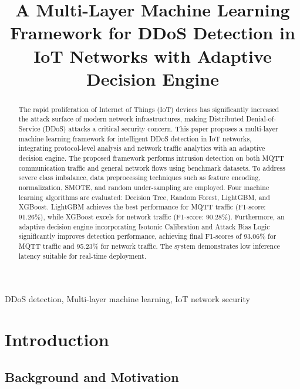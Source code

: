 \documentclass[conference]{IEEEtran}
\begin{document}
\title{A Multi-Layer Machine Learning Framework for DDoS Detection in IoT Networks with Adaptive Decision Engine}

\author{
}

\maketitle

\begin{abstract}
The rapid proliferation of Internet of Things (IoT) devices has significantly increased the attack surface of modern network infrastructures, making Distributed Denial-of-Service (DDoS) attacks a critical security concern. This paper proposes a multi-layer machine learning framework for intelligent DDoS detection in IoT networks, integrating protocol-level analysis and network traffic analytics with an adaptive decision engine. The proposed framework performs intrusion detection on both MQTT communication traffic and general network flows using benchmark datasets. To address severe class imbalance, data preprocessing techniques such as feature encoding, normalization, SMOTE, and random under-sampling are employed. Four machine learning algorithms are evaluated: Decision Tree, Random Forest, LightGBM, and XGBoost. LightGBM achieves the best performance for MQTT traffic (F1-score: 91.26\%), while XGBoost excels for network traffic (F1-score: 90.28\%). Furthermore, an adaptive decision engine incorporating Isotonic Calibration and Attack Bias Logic significantly improves detection performance, achieving final F1-scores of 93.06\% for MQTT traffic and 95.23\% for network traffic. The system demonstrates low inference latency suitable for real-time deployment.
\end{abstract}

\begin{IEEEkeywords}
DDoS detection, Multi-layer machine learning, IoT network security
\end{IEEEkeywords}

\section{Introduction}

\subsection{Background and Motivation}
\end{document}
